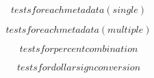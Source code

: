 \documentclass{article}
\begin{document}


\begin{equation}
  tests for each metadata (single)
\end{equation}

\begin{equation}
  tests for each metadata (multiple)
\end{equation}

\begin{equation}
  tests for percent combination
\end{equation}

\begin{equation}
  tests for dollarsign conversion
\end{equation}
\end{document}

